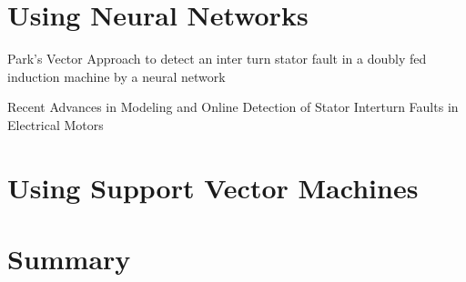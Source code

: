 \section{Using Neural Networks} %
\label{sec:using_nn}

Park’s Vector Approach to detect an inter turn stator fault in a doubly fed induction machine by a neural network 

Recent Advances in Modeling and Online Detection of Stator Interturn Faults in Electrical Motors

\section{Using Support Vector Machines} %
\label{sec:using_svm}

\section{Summary} %
\label{sec:related_work_summary}
